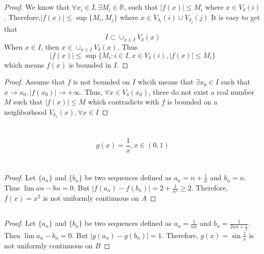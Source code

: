 \documentclass{article}
\begin{document}
    \section{}
        \begin{proof}
            We know that $\forall x_i\in I,\exists M_i\in \mathbb{R}$, such that
            $|f(x)|\leq M_i$ where $x\in V_\delta(i)$. Therefore,$|f(x)|\leq \sup\{M_i,M_j\}$ where $x\in V_{\delta_i}(i)\cup V_{\delta_j}(j)$
            It is easy to get that
            $$I\subset \cup_{x\in I}V_\delta(x)$$ 
            When $x\in I$, then $x\in \cup_{x\in I}V_\delta(x)$. Thus $$|f(x)|\leq \sup\{M_i:i\in I,x\in V_{\delta}(i),|f(x)|\leq M_i\}$$ which means $f(x)$ is bounded in $I$.
        \end{proof}
        \begin{proof}
            Assume that $f$ is not bounded on $I$ whcih means that $\exists x_0\in I$ such that $x\rightarrow x_0, |f(x_0)|\rightarrow +\infty$. Thus, $\forall x\in V_\delta(x_0)$, there do not exist a real number $M$ such that $|f(x)|\leq M$ which contradicts with $f$ is bounded on a neighborhood $V_{\delta_x}(x), \forall x\in I$
        \end{proof}
    \section{}
        \paragraph{
            $$g(x)=\frac{1}{x},x\in(0,1)$$
        }
    \section{}
        \subsection{}
            \begin{proof}
                Let $\{a_n\}$ and $\{b_n\}$ be two sequences defined as $a_n=n+\frac{1}{n}$ and $b_n=n$. Thus $\lim an-bn=0$. But $|f(a_n)-f(b_n)|=2+\frac{1}{n^2}\geq 2$. Therefore, $f(x)=x^2$ is not uniformly continuous on $A$
            \end{proof}
        \subsection{}
            \begin{proof}
                Let $\{a_n\}$ and $\{b_n\}$ be two sequences defined as $a_n=\frac{1}{n\pi}$ and $b_n=\frac{1}{2n\pi+\frac{\pi}{2}}$. Thsu $\lim a_n-b_n=0$. But $|g(a_n)-g(b_n)|=1$. Therefore, $g(x)=\sin\frac{1}{x}$ is not uniformly continuous on $B$
            \end{proof}
\end{document}
